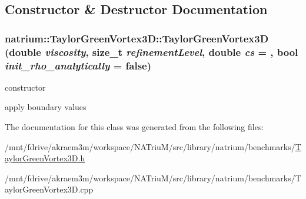 \subsection{Constructor \& Destructor Documentation}
\hypertarget{classnatrium_1_1TaylorGreenVortex3D_a8d6071197520b6fb7766132318a15029}{
\subsubsection[{TaylorGreenVortex3D}]{\setlength{\rightskip}{0pt plus 5cm}natrium::TaylorGreenVortex3D::TaylorGreenVortex3D (double {\em viscosity}, \/  size\_\-t {\em refinementLevel}, \/  double {\em cs} = {}, \/  bool {\em init\_\-rho\_\-analytically} = {\ttfamily false})}}
\label{classnatrium_1_1TaylorGreenVortex3D_a8d6071197520b6fb7766132318a15029}


constructor 

apply boundary values 

The documentation for this class was generated from the following files:\begin{DoxyCompactItemize}
\item 
/mnt/fdrive/akraem3m/workspace/NATriuM/src/library/natrium/benchmarks/\hyperlink{TaylorGreenVortex3D_8h}{TaylorGreenVortex3D.h}\item 
/mnt/fdrive/akraem3m/workspace/NATriuM/src/library/natrium/benchmarks/TaylorGreenVortex3D.cpp\end{DoxyCompactItemize}
